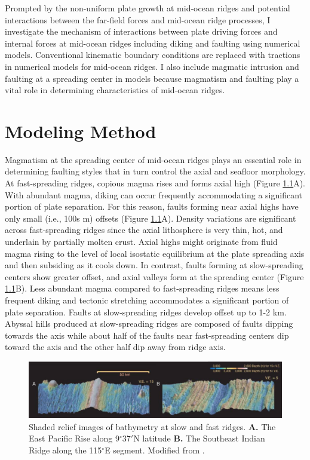 \documentclass[letterpaper,12pt,notitle]{memphisthesis}                     %
\begin{document}
Prompted by the non-uniform plate growth at mid-ocean ridges and potential interactions between the far-field forces and mid-ocean ridge processes, I investigate the mechanism of interactions between plate driving forces and internal forces at mid-ocean ridges including diking and faulting using numerical models. Conventional kinematic boundary conditions are replaced with tractions in numerical models for mid-ocean ridges. I also include magmatic intrusion and faulting at a spreading center in models because magmatism and faulting play a vital role in determining characteristics of mid-ocean ridges. 

\chapter{Modeling Method}

Magmatism at the spreading center of mid-ocean ridges plays an essential role in determining faulting styles that in turn control the axial and seafloor morphology. At fast-spreading ridges, copious magma rises and forms axial high (Figure \ref{fig:ridgebathymetry}A). With abundant magma, diking can occur frequently accommodating a significant portion of plate separation. For this reason, faults forming near axial highs have only small (i.e., 100s m) offsets (Figure \ref{fig:ridgebathymetry}A). Density variations are significant across fast-spreading ridges since the axial lithosphere is very thin, hot, and underlain by partially molten crust. Axial highs might originate from fluid magma rising to the level of local isostatic equilibrium at the plate spreading axis and then subsiding as it cools down. In contrast, faults forming at slow-spreading centers show greater offset, and axial valleys form at the spreading center (Figure \ref{fig:ridgebathymetry}B). Less abundant magma compared to fast-spreading ridges means less frequent diking and tectonic stretching accommodates a significant portion of plate separation. Faults at slow-spreading ridges develop offset up to 1-2 km. Abyssal hills produced at slow-spreading ridges are composed of faults dipping towards the axis while about half of the faults near fast-spreading centers dip toward the axis and the other half dip away from ridge axis.

\begin{figure}[!htb]
	\centering
	\includegraphics[width=0.99\linewidth]{./figs/bathy_buck.png}
	\caption{Shaded relief images of bathymetry at slow and fast ridges. \textbf{A.} The East Pacific Rise along 9$^\circ$37$'$N latitude \textbf{B.} The Southeast Indian Ridge along the 115$^\circ$E segment. Modified from \citet{Buck2005}.}
	\label{fig:ridgebathymetry}
\end{figure}
\end{document}
